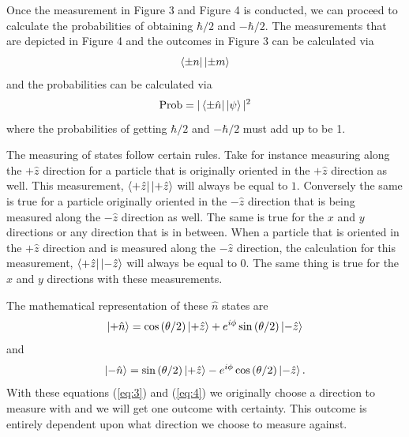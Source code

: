 \documentclass[twocolumn]{article}
\begin{document}
\newline
Once the measurement in Figure 3 and Figure 4 is conducted, we can proceed to calculate the probabilities of obtaining $\hbar/2$ and $-\hbar/2$. The measurements that are depicted in Figure 4 and the outcomes in Figure 3 can be calculated via
\begin{equation} \label{eq:1}
\bra{\pm n}\ket{\pm m}
\end{equation}
and the probabilities can be calculated via
\begin{equation} \label{eq:2}
\text{Prob}=|\bra{\pm\hat{n}}\ket{\psi}|^2
\end{equation}
where the probabilities of getting $\hbar/2$ and $-\hbar/2$ must add up to be 1. 

The measuring of states follow certain rules. Take for instance measuring along the $+\hat{z}$ direction for a particle that is originally oriented in the $+\hat{z}$ direction as well. This measurement, $\bra{+\hat{z}}\ket{+\hat{z}}$ will always be equal to $1$. Conversely the same is true for a particle originally oriented in the $-\hat{z}$ direction that is being measured along the $-\hat{z}$ direction as well. The same is true for the $x$ and $y$ directions or any direction that is in between. When a particle that is oriented in the $+\hat{z}$ direction and is measured along the $-\hat{z}$ direction, the calculation for this measurement, $\bra{+\hat{z}}\ket{-\hat{z}}$ will always be equal to 0. The same thing is true for the $x$ and $y$ directions with these measurements. 

The mathematical representation of these $\hat{n}$ states are 
\begin{equation} \label{eq:3}
\ket{+\hat{n}}=\cos{(\theta/2)}\ket{+\hat{z}}+e^{i\phi}\sin{(\theta/2)}\ket{-\hat{z}}
\end{equation}
and
\begin{equation} \label{eq:4}
\ket{-\hat{n}}=\sin{(\theta/2)}\ket{+\hat{z}}-e^{i\phi}\cos{(\theta/2)}\ket{-\hat{z}}.
\end{equation}
With these equations (\ref{eq:3}) and (\ref{eq:4}) we originally choose a direction to measure with and we will get one outcome with certainty. This outcome is entirely dependent upon what direction we choose to measure against. 
\end{document}
